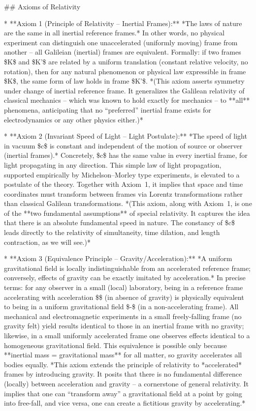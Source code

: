 \documentclass{article}
\begin{document}
## Axioms of Relativity

* **Axiom 1 (Principle of Relativity – Inertial Frames):** *The laws of nature are the same in all inertial reference frames.* In other words, no physical experiment can distinguish one unaccelerated (uniformly moving) frame from another – all Galileian (inertial) frames are equivalent. Formally: if two frames \$K\$ and \$K'\$ are related by a uniform translation (constant relative velocity, no rotation), then for any natural phenomenon or physical law expressible in frame \$K\$, the same form of law holds in frame \$K'\$. *(This axiom asserts symmetry under change of inertial reference frame. It generalizes the Galilean relativity of classical mechanics – which was known to hold exactly for mechanics – to **all** phenomena, anticipating that no “preferred” inertial frame exists for electrodynamics or any other physics either.)*

* **Axiom 2 (Invariant Speed of Light – Light Postulate):** *The speed of light in vacuum \$c\$ is constant and independent of the motion of source or observer (inertial frames).* Concretely, \$c\$ has the same value in every inertial frame, for light propagating in any direction. This simple law of light propagation, supported empirically by Michelson–Morley type experiments, is elevated to a postulate of the theory. Together with Axiom 1, it implies that space and time coordinates must transform between frames via Lorentz transformations rather than classical Galilean transformations. *(This axiom, along with Axiom 1, is one of the **two fundamental assumptions** of special relativity. It captures the idea that there is an absolute fundamental speed in nature. The constancy of \$c\$ leads directly to the relativity of simultaneity, time dilation, and length contraction, as we will see.)*

* **Axiom 3 (Equivalence Principle – Gravity/Acceleration):** *A uniform gravitational field is locally indistinguishable from an accelerated reference frame; conversely, effects of gravity can be exactly imitated by acceleration.* In precise terms: for any observer in a small (local) laboratory, being in a reference frame accelerating with acceleration \$\$ (in absence of gravity) is physically equivalent to being in a uniform gravitational field \$-\$ (in a non-accelerating frame). All mechanical and electromagnetic experiments in a small freely-falling frame (no gravity felt) yield results identical to those in an inertial frame with no gravity; likewise, in a small uniformly accelerated frame one observes effects identical to a homogeneous gravitational field. This equivalence is possible only because **inertial mass = gravitational mass** for all matter, so gravity accelerates all bodies equally. *This axiom extends the principle of relativity to *accelerated* frames by introducing gravity. It posits that there is no fundamental difference (locally) between acceleration and gravity – a cornerstone of general relativity. It implies that one can “transform away” a gravitational field at a point by going into free-fall, and vice versa, one can create a fictitious gravity by accelerating.*
\end{document}
